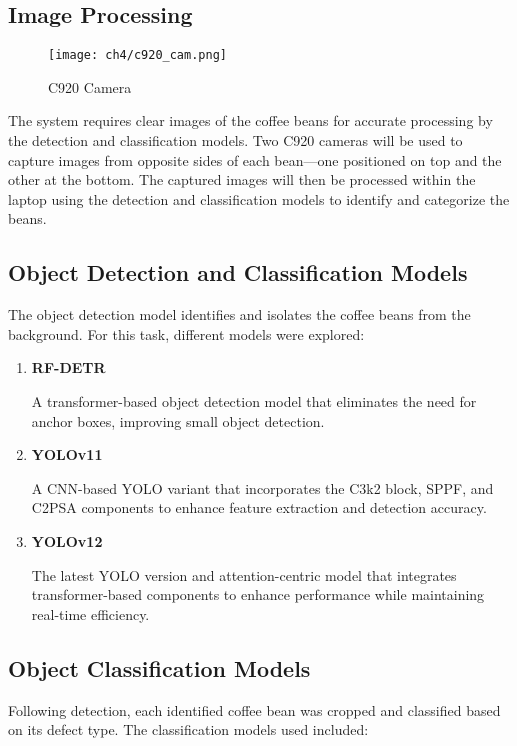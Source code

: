 \subsection{Image Processing}

\begin{figure}[H]
    \centering
    \texttt{[image: ch4/c920\_cam.png]} %
    \caption{C920 Camera}
    \label{fig:c920_camera}
\end{figure}

The system requires clear images of the coffee beans for accurate processing by the detection and classification models. Two C920 cameras will be used to capture images from opposite sides of each bean—one positioned on top and the other at the bottom. The captured images will then be processed within the laptop using the detection and classification models to identify and categorize the beans.

\subsection{Object Detection and Classification Models}

The object detection model identifies and isolates the coffee beans from the background. For this task, different models were explored:

\begin{enumerate}
	\item \textbf{RF-DETR}
	 
	A transformer-based object detection model that eliminates the need for anchor boxes, improving small object detection.

	\item \textbf{YOLOv11}
	
	A CNN-based YOLO variant that incorporates the C3k2 block, SPPF, and C2PSA components to enhance feature extraction and detection accuracy.

	\item \textbf{YOLOv12}
	
	The latest YOLO version and attention-centric model that integrates transformer-based components to enhance performance while maintaining real-time efficiency.
\end{enumerate}

\subsection{Object Classification Models}
Following detection, each identified coffee bean was cropped and classified based on its defect type. The classification models used included:

